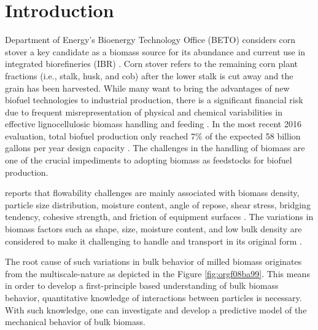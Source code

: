 \documentclass[xcolor=dvipsnames,10pt,hidelinks]{article}
\begin{document}
\section{Introduction}
\label{sec:org15fe54c}
Department of Energy's Bioenergy Technology Office (BETO) considers corn stover a key candidate as a biomass source for its abundance and current use in integrated biorefineries (IBR) \citep{doyle_integrated_2014,usdoe_u.s._2011,langholtz_2016_2016,perlack_us_2011}. Corn stover refers to the remaining corn plant fractions (i.e., stalk, husk, and cob) after the lower stalk is cut away and the grain has been harvested.
While many want to bring the advantages of new biofuel technologies to industrial production, there is a significant financial risk due to frequent misrepresentation of physical and chemical variabilities in effective lignocellulosic biomass handling and feeding \citep{crawford_effects_2016,ray_multiscale_2020,Ray_BiomassBlendingDensification_2017}.
In the most recent 2016 evaluation, total biofuel production only reached 7\% of the expected 58 billion gallons per year design capacity \citep{westover_biomass_2018}.
The challenges in the handling of biomass are one of the crucial impediments to adopting biomass as feedstocks for biofuel production.

\citet{beto_biorefinery_2016} reports that flowability challenges are mainly associated with biomass density, particle size distribution, moisture content, angle of repose, shear stress, bridging tendency, cohesive strength, and friction of equipment surfaces \citep{westover_biomass_2018}.
The variations in biomass factors such as shape, size, moisture content, and low bulk density are considered to make it challenging to handle and transport in its original form \citep{kaliyan_roll_2009}.

The root cause of such variations in bulk behavior of milled biomass originates from the multiscale-nature as depicted in the Figure \ref{fig:orgf08ba99}.
This means in order to develop a first-principle based understanding of bulk biomass behavior, quantitative knowledge of interactions between particles is necessary.
With such knowledge, one can investigate and develop a predictive model of the mechanical behavior of bulk biomass.
\end{document}
